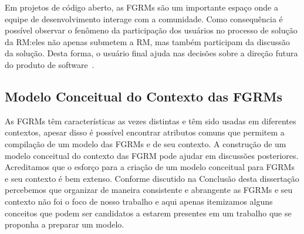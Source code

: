 Em projetos de código aberto, as FGRMs são um importante espaço onde a equipe de
desenvolvimento interage com a comunidade. Como consequência é possível observar
o fenômeno da participação dos usuários no processo de solução da RM:\@ eles não
apenas submetem a RM, mas também participam da discussão da solução. Desta
forma, o usuário final ajuda nas decisões sobre a direção futura do produto de
software~\cite{breu2010information}.

\subsection{Modelo Conceitual do Contexto das FGRMs}\label{sub:espectro_funcionalidades_fgrm}

As FGRMs têm características as vezes distintas e têm sido usadas em diferentes
contextos, apesar disso é possível encontrar atributos comuns que permitem a
compilação de um modelo das FGRMs e de seu contexto. A construção de um modelo
conceitual do contexto das FGRM pode ajudar em discussões posteriores.
Acreditamos que o esforço para a criação de um modelo conceitual para FGRMs e
seu contexto é bem extenso. Conforme discutido na Conclusão desta dissertação
percebemos que organizar de maneira consistente e abrangente as FGRMs e seu
contexto não foi o foco de nosso trabalho e aqui apenas itemizamos alguns
conceitos que podem ser candidatos a estarem presentes em um trabalho que se
proponha a preparar um modelo.



